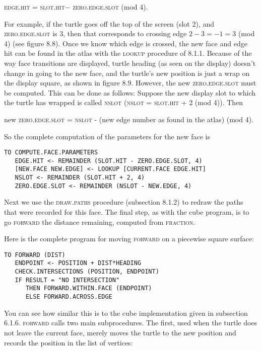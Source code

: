 \documentclass{book}
\begin{document}
\textsc{edge}\textsc{.hit} = \textsc{slot}\textsc{.hit}$ - $ \textsc{zero}\textsc{.edge}\textsc{.slot} (mod 4).

For example, if the turtle goes off the top of the screen (slot 2), and
\textsc{zero}\textsc{.edge}\textsc{.slot} is 3, then that corresponds to crossing edge $2 - 3 = -1 = 3$ (mod 4) (see figure 8.8). Once we know which edge is crossed,
the new face and edge hit can be found in the atlas with the \textsc{lookup}
procedure of 8.1.1. Because of the way face transitions are displayed,
turtle heading (as seen on the display) doesn't change in going to the
new face, and the turtle's new position is just a wrap on the display
square, as shown in figure 8.9. However, the new \textsc{zero}\textsc{.edge}\textsc{.slot} must
be computed. This can be done as follows: Suppose the new display slot
to which the turtle has wrapped is called \textsc{nslot} (\textsc{nslot} = \textsc{slot}\textsc{.hit} + 2
(mod 4)). Then

new \textsc{zero}\textsc{.edge}\textsc{.slot} = \textsc{nslot} - (new edge number as found in the atlas) (mod 4).

So the complete computation of the parameters for the new face is

\begin{verbatim}
TO COMPUTE.FACE.PARAMETERS
   EDGE.HIT <- REMAINDER (SLOT.HIT - ZERO.EDGE.SLOT, 4)
   [NEW.FACE NEW.EDGE] <- LOOKUP [CURRENT.FACE EDGE.HIT]
   NSLOT <- REMAINDER (SLOT.HIT + 2, 4)
   ZERO.EDGE.SLOT <- REMAINDER (NSLOT - NEW.EDGE, 4)
\end{verbatim}
Next we use the \textsc{draw}\textsc{.paths} procedure (subsection 8.1.2) to redraw
the paths that were recorded for this face. The final step, as with the
cube program, is to go \textsc{forward} the distance remaining, computed from
\textsc{fraction}.

Here is the complete program for moving \textsc{forward} on a piecewise
square surface:

\begin{verbatim}
TO FORWARD (DIST)
   ENDPOINT <- POSITION + DIST*HEADING
   CHECK.INTERSECTIONS (POSITION, ENDPOINT)
   IF RESULT = "NO INTERSECTION"
      THEN FORWARD.WITHIN.FACE (ENDPOINT)
      ELSE FORWARD.ACROSS.EDGE
\end{verbatim}
You can see how similar this is to the cube implementation given in
subsection 6.1.6. \textsc{forward} calls two main subprocedures. The first, used
when the turtle does not leave the current face, merely moves the turtle
to the new position and records the position in the list of vertices:
\end{document}
